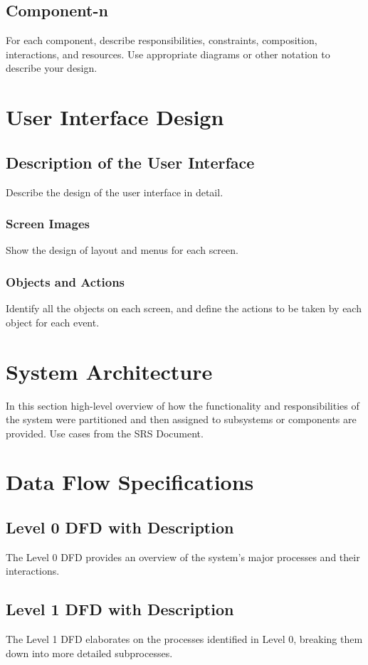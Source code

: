 \documentclass{article}
\begin{document}
\subsection{Component-n}
For each component, describe responsibilities, constraints, composition, interactions, and resources. Use appropriate diagrams or other notation to describe your design.

\section{User Interface Design}

\subsection{Description of the User Interface}
Describe the design of the user interface in detail.

\subsubsection{Screen Images}
Show the design of layout and menus for each screen.

\subsubsection{Objects and Actions}
Identify all the objects on each screen, and define the actions to be taken by each object for each event.

\section{System Architecture}

In this section high-level overview of how the functionality and responsibilities of the system were partitioned and then assigned to subsystems or components are provided.
Use cases from the SRS Document.

\section{Data Flow Specifications}

\subsection{Level 0 DFD with Description}
The Level 0 DFD provides an overview of the system's major processes and their interactions.

\subsection{Level 1 DFD with Description}
The Level 1 DFD elaborates on the processes identified in Level 0, breaking them down into more detailed subprocesses.
\end{document}
